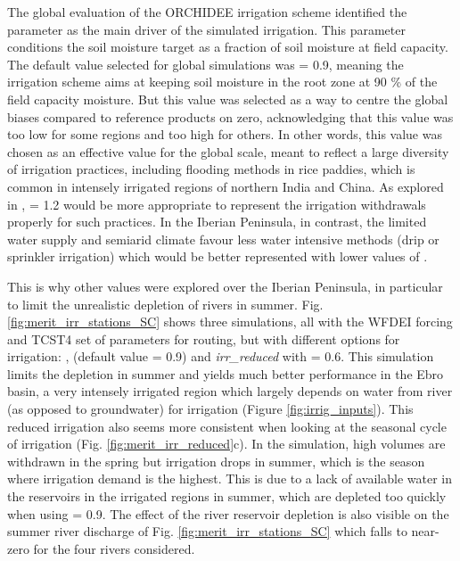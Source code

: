 \hfill

The global evaluation of the ORCHIDEE irrigation scheme \citep{arboleda-obando_validation_2024} identified the \betairrig parameter as the main driver of the simulated irrigation. This parameter conditions the soil moisture target as a fraction of soil moisture at field capacity. The default value selected for global simulations was \betairrig = 0.9, meaning the irrigation scheme aims at keeping soil moisture in the root zone at 90 \% of the field capacity moisture. But this value was selected as a way to centre the global biases compared to reference products on zero, acknowledging that this value was too low for some regions and too high for others. In other words, this \betairrig value was chosen as an effective value for the global scale, meant to reflect a large diversity of irrigation practices, including flooding methods in rice paddies, which is common in intensely irrigated regions of northern India and China. As explored in \citet{arboleda-obando_validation_2024}, \betairrig = 1.2 would be more appropriate to represent the irrigation withdrawals properly for such practices. In the Iberian Peninsula, in contrast, the limited water supply and semiarid climate favour less water intensive methods (drip or sprinkler irrigation) which would be better represented with lower values of \betairrig. 

This is why other values were explored over the Iberian Peninsula, in particular to limit the unrealistic depletion of rivers in summer. Fig. \ref{fig:merit_irr_stations_SC} shows three simulations, all with the WFDEI forcing and TCST4 set of parameters for routing, but with different options for irrigation: \noirr, \irr (default value \betairrig = 0.9) and \textit{irr\_reduced} with \betairrig = 0.6. 
This simulation limits the depletion in summer and yields much better performance in the Ebro basin, a very intensely irrigated region which largely depends on water from river (as opposed to groundwater) for irrigation (Figure \ref{fig:irrig_inputs}).
This reduced irrigation also seems more consistent when looking at the seasonal cycle of irrigation (Fig. \ref{fig:merit_irr_reduced}c). In the \irr simulation, high volumes are withdrawn in the spring but irrigation drops in summer, which is the season where irrigation demand is the highest. This is due to a lack of available water in the reservoirs in the irrigated regions in summer, which are depleted too quickly when using \betairrig = 0.9. The effect of the river reservoir depletion is also visible on the summer river discharge of Fig. \ref{fig:merit_irr_stations_SC} which falls to near-zero for the four rivers considered. 

